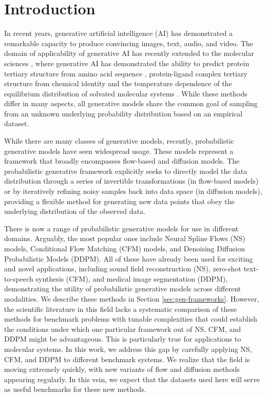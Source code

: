 \documentclass[%
 aip,
 amsmath,amssymb,
 reprint,%
]{revtex4-1}
\begin{document}
\section{Introduction}

In recent years, generative artificial intelligence (AI) has demonstrated a remarkable capacity to produce convincing images, text, audio, and video\cite{latent-diffusion,chatgpt,video-diffusion}. The domain of applicability of generative AI has recently extended to the molecular sciences \cite{tiwary2024generative}, where generative AI has demonstrated the ability to predict protein tertiary structure from amino acid sequence \cite{distributional-graphormer,alphafold-2,alphafold-3,RF-AA}, protein-ligand complex tertiary structure from chemical identity \cite{NeuralPLexer, diffdock} and the temperature dependence of the equilibrium distribution of solvated molecular systems \cite{BoltzmannGenerators, ddpm-wang-2022, thermomaps-2023}. While these methods differ in many aspects, all generative models share the common goal of sampling from an unknown underlying probability distribution based on an empirical dataset.

While there are many classes of generative models, recently, probabilistic generative models have seen widespread usage. These models represent a framework that broadly encompasses flow-based \cite{RealNVP,flow-matching-ot} and diffusion models\cite{score-based-generative}. The probabilistic generative framework explicitly seeks to directly model the data distribution through a series of invertible transformations (in flow-based models) or by iteratively refining noisy samples back into data space (in diffusion models), providing a flexible method for generating new data points that obey the underlying distribution of the observed data.

There is now a range of probabilistic generative models for use in different domains. Arguably, the most popular ones include Neural Spline Flows\cite{neural-splines} (NS) models, Conditional Flow Matching\cite{CFM} (CFM) models, and Denoising Diffusion Probabilistic Models\cite{ddpm} (DDPM). All of these have already been used for exciting and novel applications, including sound field reconstruction \cite{2024soundfield} (NS), zero-shot text-to-speech synthesis \cite{kim2023pflow} (CFM), and medical image segmentation \cite{Guo2023} (DDPM), demonstrating the utility of probabilistic generative models across different modalities. We describe these methods in Section \ref{sec:gen-frameworks}. However, the scientific literature in this field lacks a systematic comparison of these methods for benchmark problems with tunable complexities that could establish the conditions under which one particular framework out of NS, CFM, and DDPM might be advantageous. This is particularly true for applications to molecular systems. In this work, we address this gap by carefully applying NS, CFM, and DDPM to different benchmark systems. We realize that the field is moving extremely quickly, with new variants of flow and diffusion methods appearing regularly. In this vein, we expect that the datasets used here will serve as useful benchmarks for these new methods.
\end{document}
